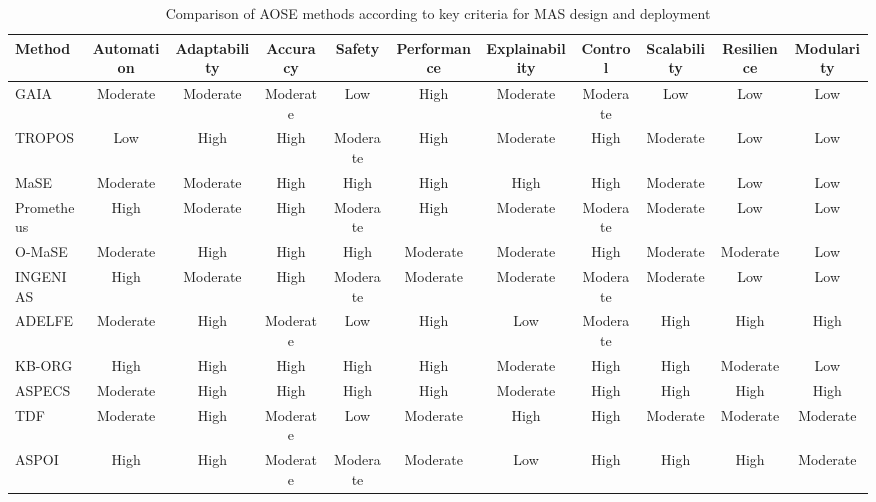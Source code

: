\documentclass[sigconf,anonymous]{aamas}
\begin{document}
\begin{table*}[h!]
  \centering
  
  \footnotesize
  
  \caption{Comparison of AOSE methods according to key criteria for MAS design and deployment}
  \begin{tabular}{lcccccccccc}
  \textbf{Method} & \textbf{Automation} & \textbf{Adaptability} & \textbf{Accuracy} & \textbf{Safety} & \textbf{Performance} & \textbf{Explainability} & \textbf{Control} & \textbf{Scalability} & \textbf{Resilience} & \textbf{Modularity} \\
  \hline
  GAIA & Moderate & Moderate & Moderate & Low & High & Moderate & Moderate & Low & Low & Low \\
  TROPOS & Low & High & High & Moderate & High & Moderate & High & Moderate & Low & Low \\
  MaSE & Moderate & Moderate & High & High & High & High & High & Moderate & Low & Low \\
  Prometheus & High & Moderate & High & Moderate & High & Moderate & Moderate & Moderate & Low & Low \\
  O-MaSE & Moderate & High & High & High & Moderate & Moderate & High & Moderate & Moderate & Low \\
  INGENIAS & High & Moderate & High & Moderate & Moderate & Moderate & Moderate & Moderate & Low & Low \\
  ADELFE & Moderate & High & Moderate & Low & High & Low & Moderate & High & High & High \\
  KB-ORG & High & High & High & High & High & Moderate & High & High & Moderate & Low \\
  ASPECS & Moderate & High & High & High & High & Moderate & High & High & High & High \\
  TDF & Moderate & High & Moderate & Low & Moderate & High & High & Moderate & Moderate & Moderate \\
  ASPOI & High & High & Moderate & Moderate & Moderate & Low & High & High & High & Moderate \\
  \end{tabular}
  \label{tab:extended-aose-comparison}
  \end{table*}
  
\end{document}
